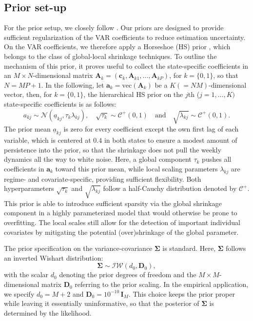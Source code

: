 \subsection{Prior set-up}\label{app:prior}
For the prior setup, we closely follow \cite{hauzenberger2020effectiveness}. Our priors are designed to provide sufficient regularization of the VAR coefficients to reduce estimation uncertainty. On the VAR coefficients, we therefore apply a Horseshoe (HS) prior \citep{carvalho2010horseshoe}, which belongs to the class of global-local shrinkage techniques. To outline the mechanism of this prior, it proves useful to collect the state-specific coefficients in an $M \times N$-dimensional matrix $\bm A_k = (\bm c_k, \bm A_{k1}, \dots, \bm A_{kP})$, for $k = \{0, 1\}$, so that $N = MP+1$. In the following, let $\bm a_k = \text{vec}(\bm A_k)$ be a $K (= NM)$-dimensional vector, then, for $k = \{0, 1\}$, the hierarchical HS prior on the $j$th ($j = 1, \dots, K)$ state-specific coefficients is as follows:
\begin{equation*}
a_{kj} \sim \mathcal{N}(\underline{a}_{kj}, \tau_k \lambda_{kj}), \quad \sqrt{\tau_k} \sim \mathcal{C}^+(0,1) \quad \text{and} \quad \sqrt{\lambda_{kj}} \sim \mathcal{C}^+(0,1).
\end{equation*}
The prior mean $\underline{a}_{kj}$ is zero for every coefficient except the own first lag of each variable, which is centered at $0.4$ in both states to ensure a modest amount of persistence into the prior, so that the shrinkage does not pull the weekly dynamics all the way to white noise. Here, a global component $\tau_k$ pushes all coefficients in $\bm a_k$ toward this prior mean, while local scaling parameters $\lambda_{kj}$ are regime- and covariate-specific, providing sufficient flexibility.  Both hyperparameters $\sqrt{\tau_{k}}$ and $\sqrt{\lambda_{kj}}$ follow a half-Cauchy distribution denoted by $\mathcal{C}^+$. This prior is able to introduce sufficient sparsity via the global shrinkage component in a highly parameterized model that would otherwise be prone to overfitting. The local scales still allow for the detection of important individual covariates by mitigating the potential (over)shrinkage of the global parameter. 

The prior specification on the variance-covariance $\bm \Sigma$ is standard. Here, $\bm \Sigma$ follows an inverted Wishart distribution: 
\begin{equation*}
    \bm \Sigma \sim \mathcal{IW}(d_0, \bm D_0), 
\end{equation*}
with the scalar $d_0$ denoting the prior degrees of freedom and the $M\times M$-dimensional matrix $\bm D_0$ referring to the prior scaling. In the empirical application, we specify $d_0 = M+2$ and $\bm D_0 = 10^{-10}\,\bm I_M$. This choice keeps the prior proper while leaving it essentially uninformative, so that the posterior of $\bm \Sigma$ is determined by the likelihood.

